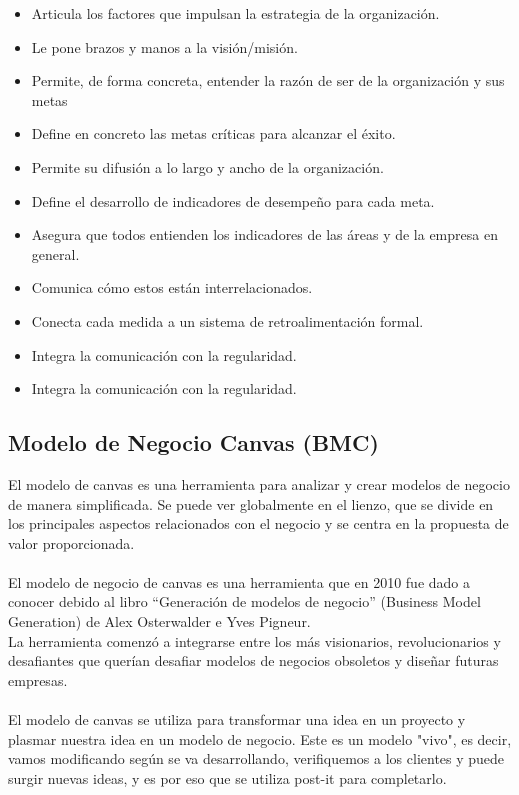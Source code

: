 \documentclass[preprint,12pt]{elsarticle}
\begin{document}
	\begin{itemize}
	\item Articula los factores que impulsan la estrategia de la organización.
	\item Le pone brazos y manos a la visión/misión.

	\item Permite, de forma concreta, entender la razón de ser de la organización y sus metas
	\item Define en concreto las metas críticas para alcanzar el éxito.

	\item Permite su difusión a lo largo y ancho de la organización.
	\item Define el desarrollo de indicadores de desempeño para cada meta.

	\item Asegura que todos entienden los indicadores de las áreas y de la empresa en general.
	\item Comunica cómo estos están interrelacionados.

	\item Conecta cada medida a un sistema de retroalimentación formal.
	\item Integra la comunicación con la regularidad.

	\item Integra la comunicación con la regularidad.
	\end{itemize}


	\subsection{\textbf{Modelo de Negocio Canvas (BMC) }}

El modelo de canvas es una herramienta para analizar y crear modelos de negocio de manera simplificada. Se puede ver globalmente en el lienzo, que se divide en los principales aspectos relacionados con el negocio y se centra en la propuesta de valor proporcionada. \\\\
El modelo de negocio de canvas es una herramienta que en 2010 fue dado a conocer debido al libro “Generación de modelos de negocio” (Business Model Generation) de Alex Osterwalder e Yves Pigneur.\\
La herramienta comenzó a integrarse entre los más visionarios, revolucionarios y desafiantes que querían desafiar modelos de negocios obsoletos y diseñar futuras empresas.\\\\
El modelo de canvas se utiliza para transformar una idea en un proyecto y plasmar nuestra idea en un modelo de negocio. Este es un modelo "vivo", es decir, vamos modificando según se va desarrollando, verifiquemos a los clientes y puede surgir nuevas ideas, y es por eso que se utiliza post-it para completarlo.
\end{document}
